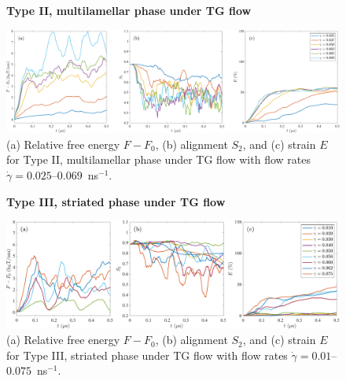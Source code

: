 \begin{figure}[h!]
\begin{center}
\textbf{Type II, multilamellar phase under TG flow}\par\medskip
\includegraphics[width=\textwidth]{SMFigures/MLTGRaw.pdf}
\end{center}
\caption{(a) Relative free energy $F - F_0$, (b) alignment $S_2$, and
  (c) strain $E$ for Type II, multilamellar phase under TG flow with
  flow rates $\dot\gamma=0.025$--$0.069$~ns$^{-1}$.
}
\label{fig:mltgraw}
\end{figure}


\begin{figure}[h!]
\begin{center}
\textbf{Type III, striated phase under TG flow}\par\medskip
\includegraphics[width=\textwidth]{SMFigures/StTGRaw.pdf}
\end{center}
\caption{(a) Relative free energy $F - F_0$, (b) alignment $S_2$, and
  (c) strain $E$ for Type III, striated phase under TG flow with flow
  rates $\dot\gamma=0.01$--$0.075$~ns$^{-1}$.
}
\label{fig:sttgraw}
\end{figure}





